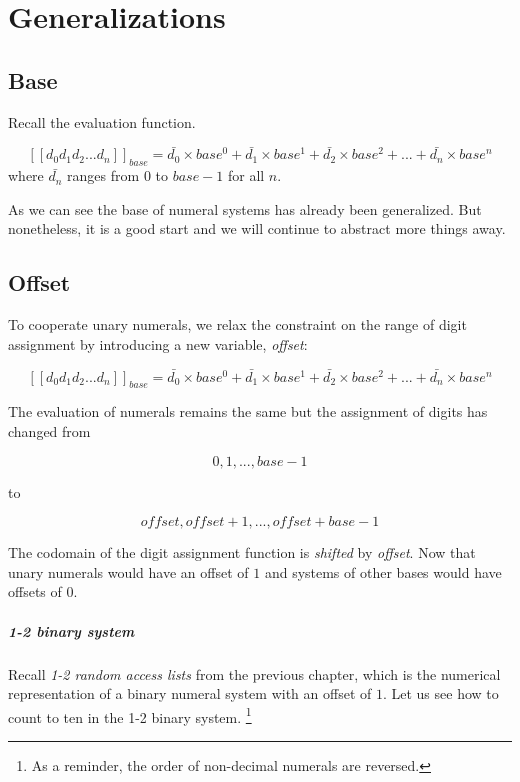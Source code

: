 \documentclass[\main/thesis.tex]{subfiles}
\begin{document}
\chapter{Generalizations}\label{generalizations}


\section{Base}

Recall the evaluation function.

$$
    [\![d_0d_1d_2...d_n]\!]_{base}
    =
    \bar{d_0}\times base^0 + \bar{d_1}\times base^1 + \bar{d_2}\times base^2 + ... + \bar{d_n}\times base^n
$$
%
where $ \bar{d_n} $ ranges from $ 0 $ to $ base - 1 $ for all $ n $.

As we can see the base of numeral systems has already been generalized.
But nonetheless, it is a good start and we will continue to abstract more things
away.

\section{Offset}

To cooperate unary numerals, we relax the constraint on the range of digit
assignment by introducing a new variable, \textit{offset}:

$$
    [\![d_0d_1d_2...d_n]\!]_{base}
    =
    \bar{d_0}\times base^0 + \bar{d_1}\times base^1 + \bar{d_2}\times base^2 + ... + \bar{d_n}\times base^n
$$

The evaluation of numerals remains the same but the assignment of digits has changed from

$$
    { 0, 1, ..., \mathit{base} - 1 }
$$

to

$$
    { \mathit{offset}, \mathit{offset} + 1, ..., \mathit{offset} + \mathit{base} - 1 }
$$

The codomain of the digit assignment function is \textit{shifted} by \textit{offset}.
Now that unary numerals would have an offset of $ 1 $
and systems of other bases would have offsets of $ 0 $.

\paragraph{1-2 binary system}
Recall \textit{1-2 random access lists} from the previous chapter,
which is the numerical representation of a binary numeral system with an offset
of $ 1 $.
Let us see how to count to ten in the 1-2 binary system.
\footnote{As a reminder, the order of non-decimal numerals are reversed.}
\end{document}
